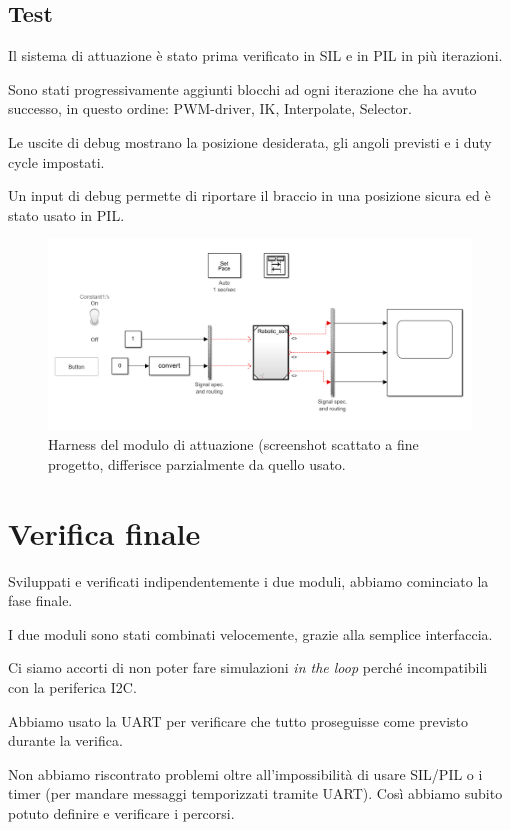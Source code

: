 \documentclass[12pt]{report}
\begin{document}
\section{Test}

Il sistema di attuazione è stato prima verificato in SIL e in PIL in più iterazioni.

Sono stati progressivamente aggiunti blocchi ad ogni iterazione che ha avuto successo, in questo ordine: PWM-driver, IK, Interpolate, Selector.

Le uscite di debug mostrano la posizione desiderata, gli angoli previsti e i duty cycle impostati.

Un input di debug permette di riportare il braccio in una posizione sicura ed è stato usato in PIL.

\begin{figure}
\includegraphics[width=\textwidth]{Harness}
\caption{Harness del modulo di attuazione (screenshot scattato a fine progetto, differisce parzialmente da quello usato.}
\end{figure}

\chapter{Verifica finale}

Sviluppati e verificati indipendentemente i due moduli, abbiamo cominciato la fase finale.

I due moduli sono stati combinati velocemente, grazie alla semplice interfaccia.

Ci siamo accorti di non poter fare simulazioni \emph{in the loop} perché incompatibili con la periferica I2C.

Abbiamo usato la UART per verificare che tutto proseguisse come previsto durante la verifica.

Non abbiamo riscontrato problemi oltre all'impossibilità di usare SIL/PIL o i timer (per mandare messaggi temporizzati tramite UART). Così abbiamo subito potuto definire e verificare i percorsi.
\end{document}
